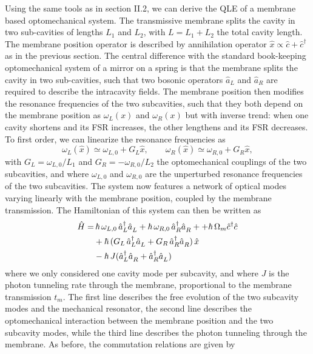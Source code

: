 Using the same tools as in section II.2, we can derive the QLE of a membrane based optomechanical system. The transmissive membrane splits the cavity in two sub-cavities of lengths \(L_1\) and \(L_2\), with \(L=L_1+L_2\) the total cavity length. The membrane position operator is described by annihilation operator $\hat x \propto \hat c + \hat c^{\dagger} $ as in the previous section. The central difference with the standard book-keeping optomechanical system of a mirror on a spring is that the membrane splits the cavity in two sub-cavities, such that two bosonic operators \(\hat a_L\) and \(\hat a_R\) are required to describe the intracavity fields. The membrane position then modifies the resonance frequencies of the two subcavities, such that they both depend on the membrane position as \(\omega_L(x)\) and \(\omega_R(x)\) but with inverse trend: when one cavity shortens and its FSR increases, the other lengthens and its FSR decreases. To first order, we can linearize the resonance frequencies as
\begin{equation}
\omega_L(\hat x) \simeq \omega_{L,0} + G_L \hat x, \qquad \omega_R(\hat x) \simeq \omega_{R,0} + G_R \hat x,
\end{equation}
with \(G_L = \omega_{L,0}/L_1\) and \(G_R = - \omega_{R,0}/L_2\) the optomechanical couplings of the two subcavities, and where \(\omega_{L,0}\) and \(\omega_{R,0}\) are the unperturbed resonance frequencies of the two subcavities. 
The system now features a network of optical modes varying linearly with the membrane position, coupled by the membrane transmission. The Hamiltonian of this system can then be written as 
\begin{equation}
  \begin{split}
    \hat{H} = & \,  \hbar \, \omega_{L,0} \, \hat a_L^\dagger \hat{a}^{\vphantom{\dagger}}_L + \hbar \, \omega_{R,0} \, \hat{a}_R^\dagger \hat{a}_R^{\vphantom{\dagger}} + + \hbar \, \Omega_m \hat c^\dagger \hat c \\
    & + \hbar \,  (G_L \,  \hat a_L^\dagger \hat{a}_L^{\vphantom{\dagger}} + G_R \, \hat a_R^\dagger \hat{a}_R^{\vphantom{\dagger}}) \,  \hat x  \\
    & - \hbar \, J(\hat{a}_L^\dagger \hat{a}_R^{\vphantom{\dagger}} + \hat{a}_R^\dagger \hat{a}_L^{\vphantom{\dagger}})  
  \end{split}
\end{equation}
where we only considered one cavity mode per subcavity, and where \(J\) is the photon tunneling rate through the membrane, proportional to the membrane transmission \(t_m\). The first line describes the free evolution of the two subcavity modes and the mechanical resonator, the second line describes the optomechanical interaction between the membrane position and the two subcavity modes, while the third line describes the photon tunneling through the membrane. As before, the commutation relations are given by 
